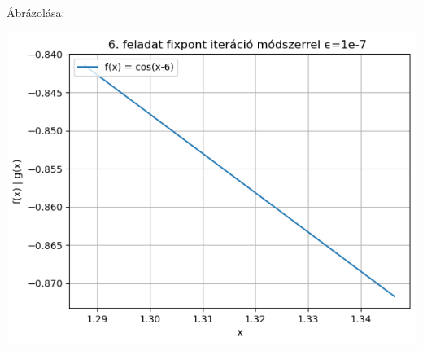 \documentclass{article}
\begin{document}
Ábrázolása: 

\includegraphics[scale=1]{../plot_9_2.png} 
 
\end{document}

